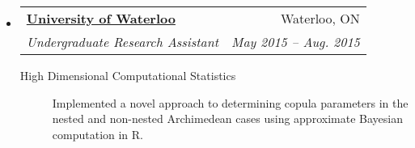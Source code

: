 \documentclass[letterpaper,10pt]{article}
\makeatletter
\newcommand{\resitem}[4]{\begin{tabular*}{17.5cm}{l@{\extracolsep{\fill}}r} \textbf{#1} & #2 \\ \textit{#3} & \textit{#4} \\ \end{tabular*} \vspace{-6pt}}
\newcommand{\ressubitem}[2]{\begin{tabular*}{17.5cm}{l@{\extracolsep{\fill}}r} \textit{#1} & \textit{#2} \\ \end{tabular*} \vspace{-6pt}}
\makeatother
\begin{document}
\begin{itemize}
{\begin{description}
			\end{description}}
\item
	\resitem{\href{https://uwaterloo.ca/}{University of Waterloo}}{Waterloo, ON}{Undergraduate Research Assistant}{May 2015 -- Aug. 2015}
		{\footnotesize \begin{description}
				\item[High Dimensional Computational Statistics] Implemented a novel approach to determining copula parameters in the nested and non-nested Archimedean cases using approximate Bayesian computation in R.
			\end{description}\vspace{-4pt}}
\begin{comment}
\item
	\resitem{\href{https://www.bloomberg.com/research/stocks/private/snapshot.asp?privcapId=71456863}{Lightstream Resources Ltd.}}{Calgary, AB}{Exploitation Engineering Summer Student}{May 2014 -- Aug. 2014}
		{\footnotesize \begin{description}
				\item[Upstream Oil and Gas] Collected, organized, and analyzed, data in support of the analysis of drilling completions, fracturing, and production in the Saskatchewan Bakken operating area
				\item[Communication] {Identified data patterns that proved valuable in the future play development of Mississippian wells, presented and discussed findings with department technical and leadership staff}
			\end{description}}
\item
	\resitem{\href{http://trailswesthockey.com/}{Trails West Hockey Association}}{Calgary, AB}{On-Ice Official}{Sept. 2011 -- Mar. 2013}
		{\footnotesize \begin{description}
				\item[Teamwork and Leadership] Acted as both a linesman and a head referee for minor hockey games at the atom and peewee level, utilizing situational awareness, confidence in calls, memory of regulations, and initiative

\end{comment}
\end{itemize}
\end{document}
